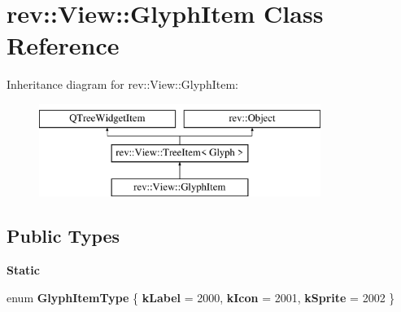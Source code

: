 \hypertarget{classrev_1_1_view_1_1_glyph_item}{}\section{rev\+::View\+::Glyph\+Item Class Reference}
\label{classrev_1_1_view_1_1_glyph_item}
Inheritance diagram for rev\+::View\+::Glyph\+Item\+:\begin{figure}[H]
\begin{center}
\leavevmode
\includegraphics[height=3.000000cm]{classrev_1_1_view_1_1_glyph_item}
\end{center}
\end{figure}
\subsection*{Public Types}
\begin{Indent}\textbf{ Static}\par
\begin{DoxyCompactItemize}
\item 
\mbox{\label{classrev_1_1_view_1_1_glyph_item_a34480911a5e76aad447ad74b5abaaab7}} 
enum {\bfseries Glyph\+Item\+Type} \{ {\bfseries k\+Label} = 2000, 
{\bfseries k\+Icon} = 2001, 
{\bfseries k\+Sprite} = 2002
 \}
\end{DoxyCompactItemize}
\end{Indent}
